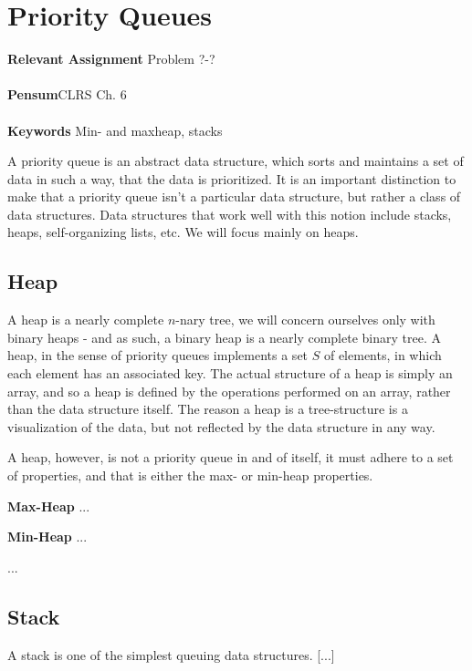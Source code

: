 
\chapter{Priority Queues}
\label{ch:priorityqueues}

\textbf{Relevant Assignment} Problem ?-?\\\\
\textbf{Pensum}CLRS Ch. 6\\\\
\textbf{Keywords} Min- and maxheap, stacks
\vspace{1in}

\noindent A priority queue is an abstract data structure, which sorts and
maintains a set of data in such a way, that the data is prioritized. It is an
important distinction to make that a priority queue isn't a particular data
structure, but rather a class of data structures. Data structures that work
well with this notion include stacks, heaps, self-organizing lists, etc.
We will focus mainly on heaps.

\section{Heap}
A heap is a nearly complete $n$-nary tree, we will concern ourselves only with
binary heaps - and as such, a binary heap is a nearly complete binary tree. A
heap, in the sense of priority queues implements a set $S$ of elements, in
which each element has an associated key. The actual structure of a heap is
simply an array, and so a heap is defined by the operations performed on an
array, rather than the data structure itself. The reason a heap is a
tree-structure is a visualization of the data, but not reflected by the data
structure in any way.


A heap, however, is not a priority queue in and of itself, it must adhere to
a set of properties, and that is either the max- or min-heap properties.

\begin{description}
	\item \textbf{Max-Heap} ...
	\item \textbf{Min-Heap} ...
\end{description}
...

\section{Stack}
A stack is one of the simplest queuing data structures. [...]

